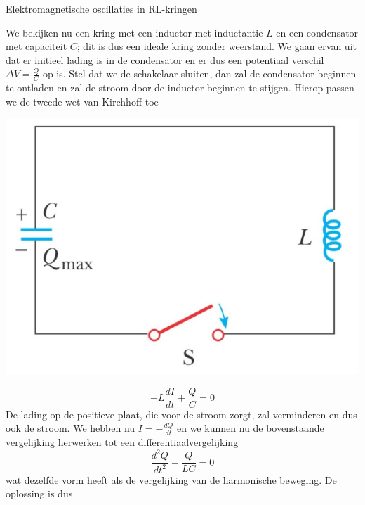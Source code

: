 \begin{app}{Elektromagnetische oscillaties in RL-kringen}
    \vspace{-0.2cm}
    \begin{minipage}{.73\textwidth}
        We bekijken nu een kring met een inductor met inductantie $L$ en een condensator met capaciteit $C$; dit is dus een ideale kring zonder weerstand. 
        We gaan ervan uit dat er initieel lading is in de condensator en er dus een potentiaal verschil $\Delta V = \tfrac{Q}{C}$ op is. Stel dat we de schakelaar sluiten, 
        dan zal de condensator beginnen te ontladen en zal de stroom door de inductor beginnen te stijgen. Hierop passen we de tweede wet van Kirchhoff toe
    \end{minipage}
    \begin{minipage}{.23\textwidth}
        \vspace{0.3cm}\includegraphics[scale = 0.35]{Images/Magnetisme/LCKring}
    \end{minipage}
    \vspace{-0.3cm}
    \begin{equation*}
        -L\dfrac{dI}{dt} + \dfrac{Q}{C} = 0
    \end{equation*}
    De lading op de positieve plaat, die voor de stroom zorgt, zal verminderen en dus ook de stroom. We hebben nu $I = -\tfrac{dQ}{dt}$ en we kunnen nu de bovenstaande vergelijking herwerken tot
    een differentiaalvergelijking
    \begin{equation*}
        \dfrac{d^{2}Q}{dt^{2}} + \dfrac{Q}{LC} = 0
    \end{equation*}
    wat dezelfde vorm heeft als de vergelijking van de harmonische beweging. De oplossing is dus


\end{app}
